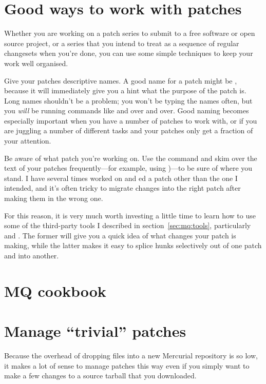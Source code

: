 \section{Good ways to work with patches}

Whether you are working on a patch series to submit to a free software
or open source project, or a series that you intend to treat as a
sequence of regular changesets when you're done, you can use some
simple techniques to keep your work well organised.

Give your patches descriptive names.  A good name for a patch might be
, because it will immediately give
you a hint what the purpose of the patch is.  Long names shouldn't be
a problem; you won't be typing the names often, but you \emph{will} be
running commands like  and  over and over.
Good naming becomes especially important when you have a number of
patches to work with, or if you are juggling a number of different
tasks and your patches only get a fraction of your attention.

Be aware of what patch you're working on.  Use the 
command and skim over the text of your patches frequently---for
example, using )---to be sure of where
you stand.  I have several times worked on and ed a
patch other than the one I intended, and it's often tricky to migrate
changes into the right patch after making them in the wrong one.

For this reason, it is very much worth investing a little time to
learn how to use some of the third-party tools I described in
section~\ref{sec:mq:tools}, particularly  and
.  The former will give you a quick idea of what
changes your patch is making, while the latter makes it easy to splice
hunks selectively out of one patch and into another.

\section{MQ cookbook}

\section{Manage ``trivial'' patches}

Because the overhead of dropping files into a new Mercurial repository
is so low, it makes a lot of sense to manage patches this way even if
you simply want to make a few changes to a source tarball that you
downloaded.

